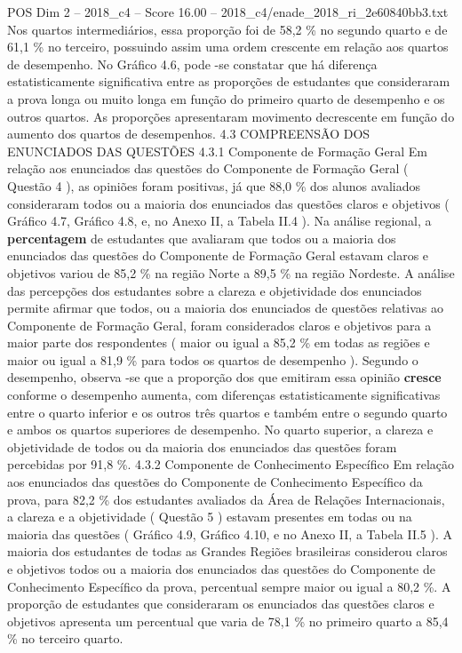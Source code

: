 \begin{textsample}{POS Dim 2 – 2018\_c4 – Score 16.00 – 2018\_c4/enade\_2018\_ri\_2e60840bb3.txt}
Nos quartos intermediários, essa proporção foi de 58,2 \% no segundo quarto e de 61,1 \% no terceiro, possuindo assim uma ordem crescente em relação aos quartos de desempenho.
No Gráfico 4.6, pode -se constatar que há diferença estatisticamente significativa entre as proporções de estudantes que consideraram a prova longa ou muito longa em função do primeiro quarto de desempenho e os outros quartos.
As proporções apresentaram movimento decrescente em função do aumento dos quartos de desempenhos. 4.3 COMPREENSÃO DOS ENUNCIADOS DAS QUESTÕES 4.3.1 Componente de Formação Geral Em relação aos enunciados das questões do Componente de Formação Geral ( Questão 4 ), as opiniões foram positivas, já que 88,0 \% dos alunos avaliados consideraram todos ou a maioria dos enunciados das questões claros e objetivos ( Gráfico 4.7, Gráfico 4.8, e, no Anexo II, a Tabela II.4 ).
Na análise regional, a \textbf{percentagem} de estudantes que avaliaram que todos ou a maioria dos enunciados das questões do Componente de Formação Geral estavam claros e objetivos variou de 85,2 \% na região Norte a 89,5 \% na região Nordeste.
A análise das percepções dos estudantes sobre a clareza e objetividade dos enunciados permite afirmar que todos, ou a maioria dos enunciados de questões relativas ao Componente de Formação Geral, foram considerados claros e objetivos para a maior parte dos respondentes ( maior ou igual a 85,2 \% em todas as regiões e maior ou igual a 81,9 \% para todos os quartos de desempenho ).
Segundo o desempenho, observa -se que a proporção dos que emitiram essa opinião \textbf{cresce} conforme o desempenho aumenta, com diferenças estatisticamente significativas entre o quarto inferior e os outros três quartos e também entre o segundo quarto e ambos os quartos superiores de desempenho.
No quarto superior, a clareza e objetividade de todos ou da maioria dos enunciados das questões foram percebidas por 91,8 \%. 4.3.2 Componente de Conhecimento Específico Em relação aos enunciados das questões do Componente de Conhecimento Específico da prova, para 82,2 \% dos estudantes avaliados da Área de Relações Internacionais, a clareza e a objetividade ( Questão 5 ) estavam presentes em todas ou na maioria das questões ( Gráfico 4.9, Gráfico 4.10, e no Anexo II, a Tabela II.5 ).
A maioria dos estudantes de todas as Grandes Regiões brasileiras considerou claros e objetivos todos ou a maioria dos enunciados das questões do Componente de Conhecimento Específico da prova, percentual sempre maior ou igual a 80,2 \%.
A proporção de estudantes que consideraram os enunciados das questões claros e objetivos apresenta um percentual que varia de 78,1 \% no primeiro quarto a 85,4 \% no terceiro quarto.

\end{textsample}
